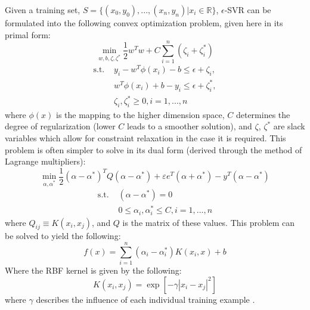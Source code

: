 \documentclass[12]{article}
\begin{document}
\noindent Given a training set, $S = \{(x_0,y_0), ..., (x_n,y_n) | x_i \in \mathbb{R}\}$,
$\epsilon$-SVR can be formulated into the following convex optimization problem,
given here in its primal form:
\begin{equation*}
\min_{w, b, \zeta, \zeta^*} \frac{1}{2} w^T w + C \sum_{i=1}^{n} (\zeta_i +
\zeta_i^*)
\end{equation*}
\begin{align*}
\mbox{s.t. } & y_i - w^T \phi (x_i) - b \leq \epsilon + \zeta_i, \\
& w^T \phi (x_i) + b - y_i \leq \epsilon + \zeta_i^*, \\
& \zeta_i, \zeta_i^* \geq 0, i=1,...,n
\end{align*}
where $\phi(x)$ is the mapping to the higher dimension space, $C$ determines the
degree of regularization (lower $C$ leads to a smoother solution), and $\zeta$, 
$\zeta^*$ are slack variables which
allow for constraint relaxation in the case it is required. This problem is
often simpler to solve in its dual form (derived through the method of Lagrange
multipliers):
\begin{equation*}
\min_{\alpha, \alpha^*} \frac{1}{2} (\alpha - \alpha^*)^T Q (\alpha - \alpha^*)
+ \varepsilon e^T (\alpha + \alpha^*) - y^T (\alpha - \alpha^*)
\end{equation*}
\begin{align*}
\mbox{s.t. } & (\alpha - \alpha^*) = 0 \\
& 0 \leq \alpha_i, \alpha_i^* \leq C, i=1, ..., n
\end{align*}
where $Q_{ij} \equiv K(x_i, x_j)$, and $Q$ is the matrix of these values.  This
problem can be solved to yield the following:
\begin{equation}
f(x) = \sum_{i=1}^n (\alpha_i - \alpha_i^*) K(x_i, x) + b
\end{equation}
Where the RBF kernel is given by the following:
\begin{equation}
K(x_i,x_j) = \exp{\left[-\gamma |x_i - x_j|^2\right]}
\end{equation}
where $\gamma$ describes the influence of each individual training example
\cite{scikit_learn_svr}.

\end{document}
